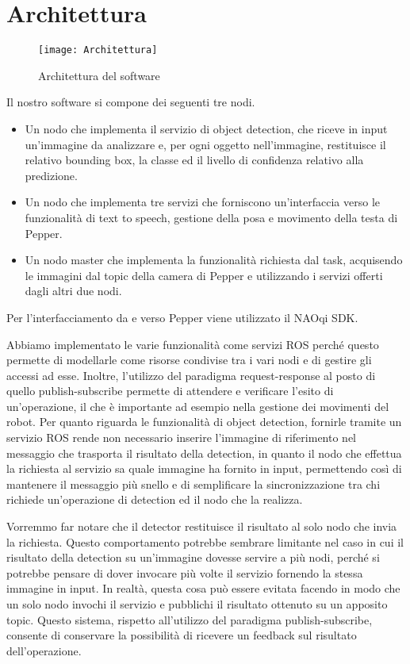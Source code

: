 \section{Architettura}

\begin{figure}[t]
	\centering
	\texttt{[image: Architettura]}
	\caption{Architettura del software}
	\label{fig:architecture}
\end{figure}

Il nostro software si compone dei seguenti tre nodi.
\begin{itemize}
    \item Un nodo che implementa il servizio di object detection, che riceve in input un’immagine da analizzare e, per ogni oggetto nell’immagine, restituisce il relativo bounding box, la classe ed il livello di confidenza relativo alla predizione.
    \item Un nodo che implementa tre servizi che forniscono un’interfaccia verso le funzionalità di text to speech, gestione della posa e movimento della testa di Pepper.
    \item Un nodo master che implementa la funzionalità richiesta dal task, acquisendo le immagini dal topic della camera di Pepper e utilizzando i servizi offerti dagli altri due nodi.
\end{itemize}
Per l’interfacciamento da e verso Pepper viene utilizzato il NAOqi SDK.

Abbiamo implementato le varie funzionalità come servizi ROS perché questo permette di modellarle come risorse condivise tra i vari nodi e di gestire gli accessi ad esse. Inoltre, l'utilizzo del paradigma request-response al posto di quello publish-subscribe permette di attendere e verificare l'esito di un'operazione, il che è importante ad esempio nella gestione dei movimenti del robot.
Per quanto riguarda le funzionalità di object detection, fornirle tramite un servizio ROS rende non necessario inserire l'immagine di riferimento nel messaggio che trasporta il risultato della detection, in quanto il nodo che effettua la richiesta al servizio sa quale immagine ha fornito in input, permettendo così di mantenere il messaggio più snello e di semplificare la sincronizzazione tra chi richiede un'operazione di detection ed il nodo che la realizza.

Vorremmo far notare che il detector restituisce il risultato al solo nodo che invia la richiesta. Questo comportamento potrebbe sembrare limitante nel caso in cui il risultato della detection su un'immagine dovesse servire a più nodi, perché si potrebbe pensare di dover invocare più volte il servizio fornendo la stessa immagine in input. In realtà, questa cosa può essere evitata facendo in modo che un solo nodo invochi il servizio e pubblichi il risultato ottenuto su un apposito topic. Questo sistema, rispetto all'utilizzo del paradigma publish-subscribe, consente di conservare la possibilità di ricevere un feedback sul risultato dell'operazione. 

